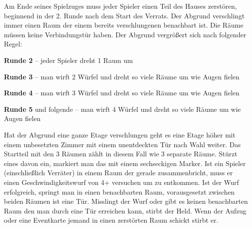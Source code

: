 
  \begin{itemize}
    \bitem Am Ende seines Spielzuges muss jeder Spieler einen Teil des Hauses zerstören, beginnend in der 2. Runde nach dem Start des Verrats. Der Abgrund verschlingt immer einen Raum der einem bereits verschlungenen benachbart ist. Die Räume müssen keine Verbindungstür haben. Der Abgrund vergrößert sich nach folgender Regel:

        \textbf{Runde 2} – jeder Spieler dreht 1 Raum um

        \textbf{Runde 3} – man wirft 2 Würfel und dreht so viele Räume um wie Augen fielen

        \textbf{Runde 4} – man wirft 3 Würfel und dreht so viele Räume um wie Augen fielen

        \textbf{Runde 5} und folgende – man wirft 4 Würfel und dreht so viele Räume um wie Augen fielen

    \bitem Hat der Abgrund eine ganze Etage verschlungen geht es eine Etage höher mit einem unbesetzten Zimmer mit einem unentdeckten Tür nach Wahl weiter.
    \bitem Das Startteil mit den 3 Räumen zählt in diesem Fall wie 3 separate Räume. Stürzt eines davon ein, markiert man das mit einem sechseckigen Marker.
    \bitem Ist ein Spieler (einschließlich Verräter) in einem Raum der gerade zusammenbricht, muss er einen Geschwindigkeitswurf von 4+ versuchen um zu entkommen.
    \bitem Ist der Wurf erfolgreich, springt man in einen benachbarten Raum, vorausgesetzt zwischen beiden Räumen ist eine Tür. Misslingt der Wurf oder gibt es keinen benachbarten Raum den man durch eine Tür erreichen kann, stirbt der Held.
    \bitem Wenn der Aufzug oder eine Eventkarte jemand in einen zerstörten Raum schickt stirbt er.
    \end{itemize}




